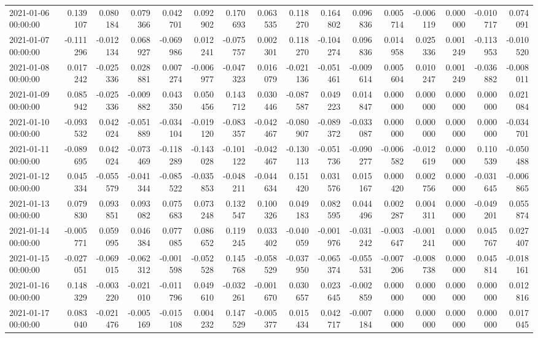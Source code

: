 \begin{tabular}{lrrrrrrrrrrrrrrr}
2021-01-06 00:00:00 & 0.139107 & 0.080184 & 0.079366 & 0.042701 & 0.092902 & 0.170693 & 0.063535 & 0.118270 & 0.164802 & 0.096836 & 0.005714 & -0.006119 & 0.000000 & -0.010717 & 0.074091 \\
2021-01-07 00:00:00 & -0.111296 & -0.012134 & 0.068927 & -0.069986 & 0.012241 & -0.075757 & 0.002301 & 0.118270 & -0.104274 & 0.096836 & 0.014958 & 0.025336 & 0.001249 & -0.113953 & -0.010520 \\
2021-01-08 00:00:00 & 0.017242 & -0.025336 & 0.028881 & 0.007274 & -0.006977 & -0.047323 & 0.016079 & -0.021136 & -0.051461 & -0.009614 & 0.005604 & 0.010247 & 0.001249 & -0.036882 & -0.008011 \\
2021-01-09 00:00:00 & 0.085942 & -0.025336 & -0.009882 & 0.043350 & 0.050456 & 0.143712 & 0.030446 & -0.087587 & 0.049223 & 0.014847 & 0.000000 & 0.000000 & 0.000000 & 0.000000 & 0.021084 \\
2021-01-10 00:00:00 & -0.093532 & 0.042024 & -0.051889 & -0.034104 & -0.019120 & -0.083357 & -0.042467 & -0.080907 & -0.089372 & -0.033087 & 0.000000 & 0.000000 & 0.000000 & 0.000000 & -0.034701 \\
2021-01-11 00:00:00 & -0.089695 & 0.042024 & -0.073469 & -0.118289 & -0.143028 & -0.101122 & -0.042467 & -0.130113 & -0.051736 & -0.090277 & -0.006582 & -0.012619 & 0.000000 & 0.110539 & -0.050488 \\
2021-01-12 00:00:00 & 0.045334 & -0.055579 & -0.041344 & -0.085522 & -0.035853 & -0.048211 & -0.044634 & 0.151420 & 0.031576 & 0.015167 & 0.000420 & 0.002756 & 0.000000 & -0.031645 & -0.006865 \\
2021-01-13 00:00:00 & 0.079830 & 0.093851 & 0.093082 & 0.075683 & 0.073248 & 0.132547 & 0.100326 & 0.049183 & 0.082595 & 0.044496 & 0.002287 & 0.004311 & 0.000000 & -0.049201 & 0.055874 \\
2021-01-14 00:00:00 & -0.005771 & 0.059095 & 0.046384 & 0.077085 & 0.086652 & 0.119245 & 0.033402 & -0.040059 & -0.001976 & -0.031242 & -0.003647 & -0.001241 & 0.000000 & 0.045767 & 0.027407 \\
2021-01-15 00:00:00 & -0.027051 & -0.069015 & -0.062312 & -0.001598 & -0.052528 & 0.145768 & -0.058529 & -0.037950 & -0.065374 & -0.055531 & -0.007206 & -0.008738 & 0.000000 & 0.045814 & -0.018161 \\
2021-01-16 00:00:00 & 0.148329 & -0.003220 & -0.021010 & -0.011796 & 0.049610 & -0.032261 & -0.001670 & 0.030657 & 0.023645 & -0.002859 & 0.000000 & 0.000000 & 0.000000 & 0.000000 & 0.012816 \\
2021-01-17 00:00:00 & 0.083040 & -0.021476 & -0.005169 & -0.015108 & 0.004232 & 0.147529 & -0.005377 & 0.015434 & 0.042717 & -0.007184 & 0.000000 & 0.000000 & 0.000000 & 0.000000 & 0.017045 \\

\end{tabular}
